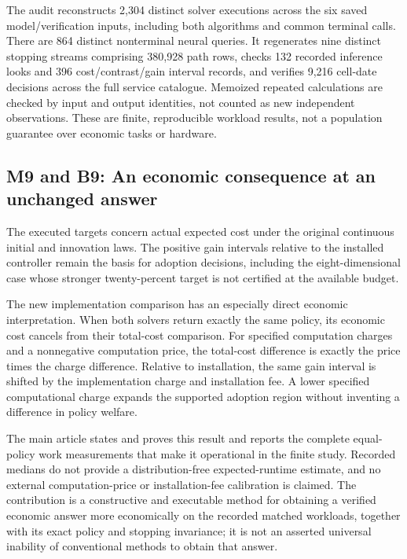 The audit reconstructs 2,304 distinct solver executions across the six
saved model/verification inputs, including both algorithms and common
terminal calls. There are 864 distinct nonterminal neural queries. It
regenerates nine distinct stopping streams comprising 380,928 path rows,
checks 132 recorded inference looks and 396 cost/contrast/gain interval
records, and verifies 9,216 cell-date decisions across the full service
catalogue. Memoized repeated calculations are checked by input and
output identities, not counted as new independent observations. These
are finite, reproducible workload results, not a population guarantee
over economic tasks or hardware.

\hypertarget{m9-and-b9-an-economic-consequence-at-an-unchanged-answer}{%
\subsection{M9 and B9: An economic consequence at an unchanged
answer}\label{m9-and-b9-an-economic-consequence-at-an-unchanged-answer}}

The executed targets concern actual expected cost under the original
continuous initial and innovation laws. The positive gain intervals
relative to the installed controller remain the basis for adoption
decisions, including the eight-dimensional case whose stronger
twenty-percent target is not certified at the available budget.

The new implementation comparison has an especially direct economic
interpretation. When both solvers return exactly the same policy, its
economic cost cancels from their total-cost comparison. For specified
computation charges and a nonnegative computation price, the total-cost
difference is exactly the price times the charge difference. Relative to
installation, the same gain interval is shifted by the implementation
charge and installation fee. A lower specified computational charge
expands the supported adoption region without inventing a difference in
policy welfare.

The main article states and proves this result and reports the complete
equal-policy work measurements that make it operational in the finite
study. Recorded medians do not provide a distribution-free
expected-runtime estimate, and no external computation-price or
installation-fee calibration is claimed. The contribution is a
constructive and executable method for obtaining a verified economic
answer more economically on the recorded matched workloads, together
with its exact policy and stopping invariance; it is not an asserted
universal inability of conventional methods to obtain that answer.

